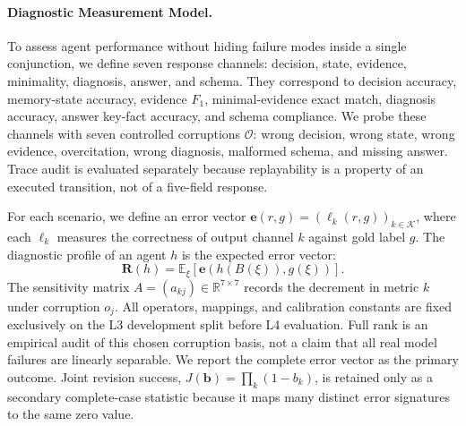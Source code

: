 \paragraph{Diagnostic Measurement Model.}
To assess agent performance without hiding failure modes inside a single conjunction, we define seven response channels: decision, state, evidence, minimality, diagnosis, answer, and schema. They correspond to decision accuracy, memory-state accuracy, evidence $F_1$, minimal-evidence exact match, diagnosis accuracy, answer key-fact accuracy, and schema compliance. We probe these channels with seven controlled corruptions $\mathcal{O}$: wrong decision, wrong state, wrong evidence, overcitation, wrong diagnosis, malformed schema, and missing answer. Trace audit is evaluated separately because replayability is a property of an executed transition, not of a five-field response.

For each scenario, we define an error vector $\mathbf{e}(r, g) = (\ell_k(r, g))_{k \in \mathcal{K}}$, where each $\ell_k$ measures the correctness of output channel $k$ against gold label $g$. The diagnostic profile of an agent $h$ is the expected error vector:
\begin{equation}
\mathbf{R}(h) = \mathbb{E}_{\xi} [\mathbf{e}(h(B(\xi)), g(\xi))].
\end{equation}
The sensitivity matrix $A=(a_{kj})\in\mathbb{R}^{7\times7}$ records the decrement in metric $k$ under corruption $o_j$. All operators, mappings, and calibration constants are fixed exclusively on the L3 development split before L4 evaluation. Full rank is an empirical audit of this chosen corruption basis, not a claim that all real model failures are linearly separable. We report the complete error vector as the primary outcome. Joint revision success, $J(\mathbf b)=\prod_k(1-b_k)$, is retained only as a secondary complete-case statistic because it maps many distinct error signatures to the same zero value.
